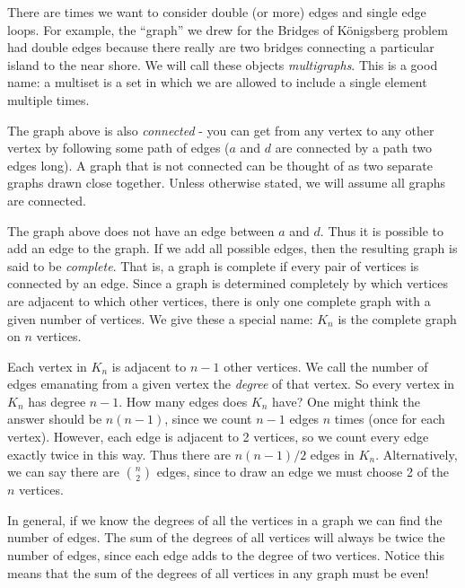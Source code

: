 \documentclass[12pt]{article}
\begin{document}
There are times we want to consider double (or more) edges and single edge loops.  For example, the ``graph'' we drew for the Bridges of K\"onigsberg problem had double edges because there really are two bridges connecting a particular island to the near shore.  We will call these objects {\em multigraphs}.  This is a good name: a multiset is a set in which we are allowed to include a single element multiple times.

The graph above is also {\em connected} - you can get from any vertex to any other vertex by following some path of edges ($a$ and $d$ are connected by a path two edges long).  A graph that is not connected can be thought of as two separate graphs drawn close together.  Unless otherwise stated, we will assume all graphs are connected.  

The graph above does not have an edge between $a$ and $d$.  Thus it is possible to add an edge to the graph.  If we add all possible edges, then the resulting graph is said to be {\em complete}.  That is, a graph is complete if every pair of vertices is connected by an edge.  Since a graph is determined completely by which vertices are adjacent to which other vertices, there is only one complete graph with a given number of vertices.  We give these a special name: $K_n$ is the complete graph on $n$ vertices.

Each vertex in $K_n$ is adjacent to $n-1$ other vertices.  We call the number of edges emanating from a given vertex the {\em degree} of that vertex.  So every vertex in $K_n$ has degree $n-1$.  How many edges does $K_n$ have?  One might think the answer should be $n(n-1)$, since we count $n-1$ edges $n$ times (once for each vertex).  However, each edge is adjacent to 2 vertices, so we count every edge exactly twice in this way.  Thus there are $n(n-1)/2$ edges in $K_n$.  
Alternatively, we can say there are ${n \choose 2}$ edges, since to draw an edge we must choose 2 of the $n$ vertices.

In general, if we know the degrees of all the vertices in a graph we can find the number of edges.  The sum of the degrees of all vertices will always be twice the number of edges, since each edge adds to the degree of two vertices.  Notice this means that the sum of the degrees of all vertices in any graph must be even!
\end{document}
